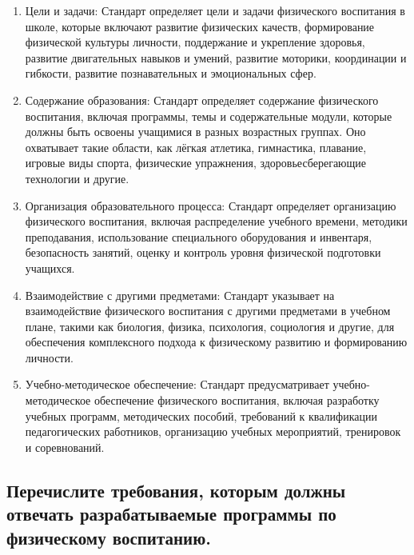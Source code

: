\begin{enumerate}
    \item Цели и задачи: Стандарт определяет цели и задачи физического воспитания в школе, которые включают развитие физических качеств, формирование физической культуры личности, поддержание и укрепление здоровья, развитие двигательных навыков и умений, развитие моторики, координации и гибкости, развитие познавательных и эмоциональных сфер.
    \item Содержание образования: Стандарт определяет содержание физического воспитания, включая программы, темы и содержательные модули, которые должны быть освоены учащимися в разных возрастных группах. Оно охватывает такие области, как лёгкая атлетика, гимнастика, плавание, игровые виды спорта, физические упражнения, здоровьесберегающие технологии и другие.
    \item Организация образовательного процесса: Стандарт определяет организацию физического воспитания, включая распределение учебного времени, методики преподавания, использование специального оборудования и инвентаря, безопасность занятий, оценку и контроль уровня физической подготовки учащихся.
    \item Взаимодействие с другими предметами: Стандарт указывает на взаимодействие физического воспитания с другими предметами в учебном плане, такими как биология, физика, психология, социология и другие, для обеспечения комплексного подхода к физическому развитию и формированию личности.
    \item Учебно-методическое обеспечение: Стандарт предусматривает учебно-методическое обеспечение физического воспитания, включая разработку учебных программ, методических пособий, требований к квалификации педагогических работников, организацию учебных мероприятий, тренировок и соревнований.
\end{enumerate}

\subsection{Перечислите требования, которым должны отвечать разрабатываемые программы по физическому воспитанию.}

